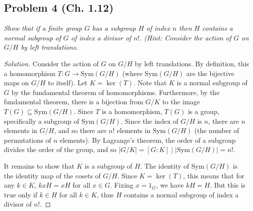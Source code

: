 \documentclass{article}
\begin{document}
\subsection*{Problem 4 (Ch. 1.12)}
{\it Show that if a finite group $G$ has a subgroup $H$ of index $n$
then $H$ contains a normal subgroup of $G$ of index a divisor of $n!$.
(\emph{Hint}: Consider the action of $G$ on $G/H$ by left translations.}
\begin{proof}[Solution]\let\qed\relax
	Consider the action of $G$ on $G/H$ by left translations.
	By definition, this a homomorphism $T \colon G \to \mathrm{Sym}(G/H)$
	(where $\mathrm{Sym}(G/H)$ are the bijective maps on $G/H$ to itself).
	Let $K = \ker(T)$.
	Note that $K$ is a normal subgroup of $G$
	by the fundamental theorem of homomorphisms.
	Furthermore, by the fundamental theorem,
	there is a bijection from $G/K$ to the image $T(G) \subseteq \mathrm{Sym}(G/H)$.
	Since $T$ is a homomorphism, $T(G)$ is a group,
	specifically a subgroup of $\mathrm{Sym}(G/H)$.
	Since the index of $G/H$ is $n$, there are $n$ elements in $G/H$,
	and so there are $n!$ elements in $\mathrm{Sym}(G/H)$
	(the number of permutations of $n$ elements).
	By Lagrange's theorem, the order of a subgroup divides
	the order of the group,
	and so $|G/K| = [G:K] \mid |\mathrm{Sym}(G/H)| = n!$.

	It remains to show that $K$ is a subgroup of $H$.
	The identity of $\mathrm{Sym}(G/H)$ is the identity
	map of the cosets of $G/H$.
	Since $K = \ker(T)$, this means that for any $k \in K$,
	$kxH = xH$ for all $x \in G$.
	Fixing $x = 1_G$, we have $kH = H$.
	But this is true only if $k \in H$ for all $k \in K$,
	thus $H$ contains a normal subgroup of index a divisor of $n!$.
\end{proof}
\end{document}
